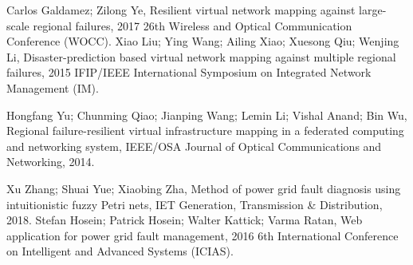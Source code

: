 \documentclass[journal]{IEEEtran}
\begin{document}
\begin{thebibliography}{1}
Carlos Galdamez; Zilong Ye, Resilient virtual network mapping against large-scale regional failures, 2017 26th Wireless and Optical Communication Conference (WOCC).
Xiao Liu; Ying Wang; Ailing Xiao; Xuesong Qiu; Wenjing Li, Disaster-prediction based virtual network mapping against multiple regional failures, 2015 IFIP/IEEE International Symposium on Integrated Network Management (IM).


Hongfang Yu; Chunming Qiao; Jianping Wang; Lemin Li; Vishal Anand; Bin Wu, Regional failure-resilient virtual infrastructure mapping in a federated computing and networking system, IEEE/OSA Journal of Optical Communications and Networking, 2014.




Xu Zhang; Shuai Yue; Xiaobing Zha, Method of power grid fault diagnosis using intuitionistic fuzzy Petri nets, IET Generation, Transmission & Distribution, 2018.
Stefan Hosein; Patrick Hosein; Walter Kattick; Varma Ratan, Web application for power grid fault management, 2016 6th International Conference on Intelligent and Advanced Systems (ICIAS).
\end{thebibliography}
 
 
 
 
 
 
 
 
 
 
 
\end{document}
